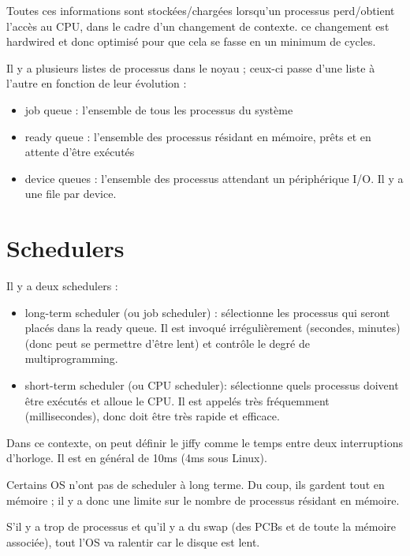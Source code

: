 Toutes ces informations sont stockées/chargées lorsqu'un processus perd/obtient l'accès au CPU, dans le cadre d'un changement de contexte. ce changement est hardwired et donc optimisé pour que cela se fasse en un minimum de cycles.

Il y a plusieurs listes de processus dans le noyau ; ceux-ci passe d'une liste à l'autre en fonction de leur évolution :

\begin{itemize}
	\item job queue : l'ensemble de tous les processus du système
	\item ready queue : l'ensemble des processus résidant en mémoire, prêts et en attente d'être exécutés
	\item device queues : l'ensemble des processus attendant un périphérique I/O. Il y a une file par device.
\end{itemize}


\section{Schedulers}

Il y a deux schedulers :

\begin{itemize}
	\item long-term scheduler (ou job scheduler) : sélectionne les processus qui seront placés dans la ready queue. Il est invoqué irrégulièrement (secondes, minutes) (donc peut se permettre d'être lent) et contrôle le degré de multiprogramming.
	\item short-term scheduler (ou CPU scheduler): sélectionne quels processus doivent être exécutés et alloue le CPU. Il est appelés très fréquemment (millisecondes), donc doit être très rapide et efficace.
\end{itemize}

Dans ce contexte, on peut définir le jiffy comme le temps entre deux interruptions d'horloge. Il est en général de 10ms (4ms sous Linux).

Certains OS n'ont pas de scheduler à long terme. Du coup, ils gardent tout en mémoire ; il y a donc une limite sur le nombre de processus résidant en mémoire.



S'il y a trop de processus et qu'il y a du swap (des PCBs et de toute la mémoire associée), tout l'OS va ralentir car le disque est lent.

